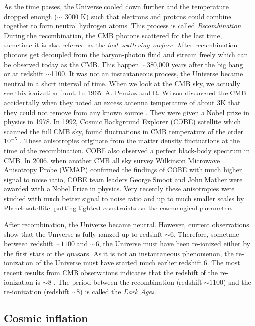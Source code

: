 \documentclass[
  11pt,
  twoside,
  openright,
  titlepage,
  headings=optiontoheadandtoc
]{scrbook}
\begin{document}
As the time passes, the Universe cooled down further and the temperature
dropped enough ($\sim$ 3000 K) such that electrons and protons could combine 
together to form neutral hydrogen
atoms. This process is called {\it Recombination}. During the recombination,
the CMB photons scattered for the last time, sometime it is also referred
as the {\it last scattering surface}. After recombination photons 
get decoupled from the baryon-photon fluid and stream freely which
can be observed today as the CMB. 
This happen $\sim$380,000 years after the big bang or at redshift 
$\sim$1100. It was not an instantaneous process, the Universe became 
neutral in a short interval of time. When we look at the CMB sky, we actually see
this ionization front. In 1965, A. Penzias and R. Wilson discovered the CMB
accidentally when they noted an excess antenna temperature of about 3K that
they could not remove from any known source \citep{2006astro.ph..1514F}. 
They were given a Nobel prize in 
physics in 1978. In 1992, Cosmic Background Explorer (COBE) satellite which
scanned the full CMB sky, found fluctuations in CMB temperature of the 
order $10^{-5}$ \citep{1996ApJ...473..576F,1999AIPC..476....1S}. 
These anisotropies originate from the matter density
fluctuations at the time of the recombination. COBE also observed a perfect
black-body spectrum in CMB. In 2006, when another CMB all sky survey 
Wilkinson Microwave Anisotropy Probe (WMAP) \citep{2006PThPS.163..185K} 
confirmed the findings of COBE
with much higher signal to noise ratio, COBE team leaders George Smoot and John Mather
were awarded with a Nobel Prize in physics. Very recently these anisotropies were studied
with much better signal to noise ratio and up to much smaller scales by Planck satellite, 
putting tightest constraints on the cosmological parameters.

After recombination, the Universe became neutral. However, current observations
show that the Universe is fully ionized up to redshift $\sim 6$. Therefore, 
sometime between redshift $\sim 1100$ and $\sim 6$, the Universe must have been
re-ionized either by the first stars or the quasars. As it is not an 
instantaneous phenomenon, the re-ionization of the Universe must have
started much earlier redshift $6$. The most recent results from
CMB observations indicates that the redshift of the re-ionization is
$\sim 8$ \citep{2015arXiv150201589P}. 
The period between the recombination (redshift $\sim 1100$)
and the re-ionization (redshift $\sim 8$) is called the {\it Dark Ages}.


\subsection{Cosmic inflation}
\end{document}
